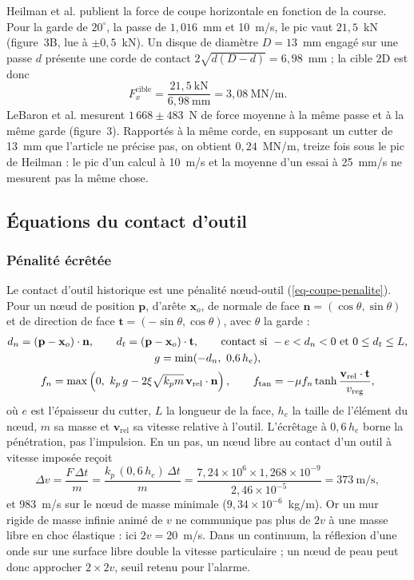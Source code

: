 Heilman et al. publient la force de coupe horizontale en fonction de la course. Pour la garde de $20^\circ$, la passe de $1{,}016$~mm et 10~m/s, le pic vaut $21{,}5$~kN (figure~3B, lue à $\pm 0{,}5$~kN). Un disque de diamètre $D = 13$~mm engagé sur une passe $d$ présente une corde de contact $2\sqrt{d(D-d)} = 6{,}98$~mm ; la cible 2D est donc
\begin{equation}
F_x^\text{cible} = \frac{21{,}5~\text{kN}}{6{,}98~\text{mm}} = 3{,}08~\text{MN/m} .
\label{eq-coupe-cible}
\end{equation}
LeBaron et al. mesurent $1\,668 \pm 483$~N de force moyenne à la même passe et à la même garde (figure~3). Rapportés à la même corde, en supposant un cutter de 13~mm que l'article ne précise pas, on obtient $0{,}24$~MN/m, treize fois sous le pic de Heilman : le pic d'un calcul à 10~m/s et la moyenne d'un essai à 25~mm/s ne mesurent pas la même chose.

\subsection{Équations du contact d'outil}

\subsubsection{Pénalité écrêtée}

Le contact d'outil historique est une pénalité nœud-outil (\cref{eq-coupe-penalite}). Pour un nœud de position $\mathbf p$, d'arête $\mathbf x_o$, de normale de face $\mathbf n = (\cos\theta, \sin\theta)$ et de direction de face $\mathbf t = (-\sin\theta, \cos\theta)$, avec $\theta$ la garde :
\begin{gather}
d_n = (\mathbf p - \mathbf x_o)\cdot\mathbf n, \qquad d_t = (\mathbf p - \mathbf x_o)\cdot\mathbf t, \qquad \text{contact si } -e < d_n < 0 \text{ et } 0 \leq d_t \leq L, \notag\\
g = \min(-d_n,\ 0{,}6\,h_e), \notag\\ f_n = \max\left(0,\ k_p\,g - 2\xi\sqrt{k_p m}\,\mathbf v_\text{rel}\cdot\mathbf n\right), \qquad f_\text{tan} = -\mu f_n \tanh\frac{\mathbf v_\text{rel}\cdot\mathbf t}{v_\text{reg}} ,
\label{eq-coupe-penalite}
\end{gather}
où $e$ est l'épaisseur du cutter, $L$ la longueur de la face, $h_e$ la taille de l'élément du nœud, $m$ sa masse et $\mathbf v_\text{rel}$ sa vitesse relative à l'outil. L'écrêtage à $0{,}6\,h_e$ borne la pénétration, pas l'impulsion. En un pas, un nœud libre au contact d'un outil à vitesse imposée reçoit
\begin{equation}
\Delta v = \frac{F\,\Delta t}{m} = \frac{k_p\,(0{,}6\,h_e)\,\Delta t}{m} = \frac{7{,}24\times10^{6} \times 1{,}268\times10^{-9}}{2{,}46\times10^{-5}} = 373~\text{m/s},
\label{eq-coupe-dv}
\end{equation}
et 983~m/s sur le nœud de masse minimale ($9{,}34\times10^{-6}$~kg/m). Or un mur rigide de masse infinie animé de $v$ ne communique pas plus de $2v$ à une masse libre en choc élastique : ici $2v = 20$~m/s. Dans un continuum, la réflexion d'une onde sur une surface libre double la vitesse particulaire ; un nœud de peau peut donc approcher $2 \times 2v$, seuil retenu pour l'alarme.

